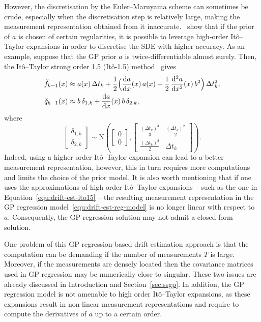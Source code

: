 However, the discretisation by the Euler--Maruyama scheme can sometimes be crude, especially when the discretisation step is relatively large, making the measurement representation obtained from it inaccurate.~\citet{ZhaoZheng2020Drift} show that if the prior of $a$ is chosen of certain regularities, it is possible to leverage high-order It\^{o}--Taylor expansions in order to discretise the SDE with higher accuracy. As an example, suppose that the GP prior $a$ is twice-differentiable almost surely. Then, the It\^{o}--Taylor strong order 1.5 (It\^{o}-1.5) method~\citep{Kloeden1992} gives
%
\begin{equation}
	\begin{split}
		\check{f}_{k-1}(x) &\approx a(x) \, \Delta t_{k} + \frac{1}{2} \Big( \frac{\mathop{}\!\mathrm{d} a}{\mathop{}\!\mathrm{d} x}(x) \, a(x) + \frac{1}{2}\, \frac{\mathop{}\!\mathrm{d}^2 a}{\mathop{}\!\mathrm{d} x^2}(x) \, b^2 \Big) \, \Delta t_k^2,\\
		\check{q}_{k-1}(x) &\approx b\,\delta_{1,k} + \frac{\mathop{}\!\mathrm{d} a}{\mathop{}\!\mathrm{d} x}(x) \, b \, \delta_{2, k},
		\label{equ:drift-est-ito15}
	\end{split}
\end{equation}
%
where
%
\begin{equation}
	\begin{bmatrix}
		\delta_{1,k} \\
		\delta_{2,k}
	\end{bmatrix} \sim \mathrm{N}\left(
	\begin{bmatrix}
		0\\0
	\end{bmatrix}, 
	\begin{bmatrix}
		\frac{(\Delta t_k)^3}{3} & \frac{(\Delta t_k)^2}{2}\\
		\frac{(\Delta t_k)^2}{2} & \Delta t_k
	\end{bmatrix}\right).
\end{equation}
%
Indeed, using a higher order It\^{o}--Taylor expansion can lead to a better measurement representation, however, this in turn requires more computations and limits the choice of the prior model. It is also worth mentioning that if one uses the approximations of high order It\^{o}--Taylor expansions -- such as the one in Equation~\eqref{equ:drift-est-ito15} -- the resulting measurement representation in the GP regression model~\eqref{equ:drift-est-reg-model} is no longer linear with respect to $a$. Consequently, the GP regression solution may not admit a closed-form solution. 

One problem of this GP regression-based drift estimation approach is that the computation can be demanding if the number of measurements $T$ is large. Moreover, if the measurements are densely located then the covariance matrices used in GP regression may be numerically close to singular. These two issues are already discussed in Introduction and Section~\ref{sec:ssgp}. In addition, the GP regression model is not amenable to high order It\^{o}--Taylor expansions, as these expansions result in non-linear measurement representations and require to compute the derivatives of $a$ up to a certain order.

